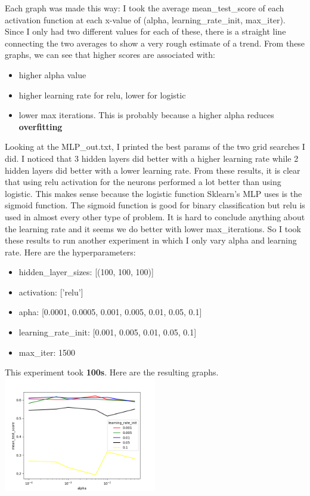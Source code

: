 \documentclass[12pt]{article}
\begin{document}
Each graph was made this way: I took the average mean\_test\_score of each activation function at each x-value of (alpha, learning\_rate\_init, max\_iter). Since I only had two different values for each of these, there is a straight line connecting the two averages to show a very rough estimate of a trend. From these graphs, we can see that higher scores are associated with:
\begin{itemize}
    \item higher alpha value
    \item higher learning rate for relu, lower for logistic
    \item lower max iterations. This is probably because a higher alpha reduces \textbf{overfitting}
\end{itemize}
Looking at the MLP\_out.txt, I printed the best params of the two grid searches I did. I noticed that 3 hidden layers did better with a higher learning rate while 2 hidden layers did better with a lower learning rate. From these results, it is clear that using relu activation for the neurons performed a lot better than using logistic. This makes sense because the logistic function Sklearn's MLP uses is the sigmoid function. The sigmoid function is good for binary classification but relu is used in almost every other type of problem. It is hard to conclude anything about the learning rate and it seems we do better with lower max\_iterations. So I took these results to run another experiment in which I only vary alpha and learning rate. Here are the hyperparameters:
\begin{itemize}
    \item hidden\_layer\_sizes: [(100, 100, 100)]
    \item activation: ['relu']
    \item apha: [0.0001, 0.0005, 0.001, 0.005, 0.01, 0.05, 0.1]
    \item learning\_rate\_init: [0.001, 0.005, 0.01, 0.05, 0.1]
    \item max\_iter: 1500
\end{itemize}
This experiment took \textbf{100s}. Here are the resulting graphs. \\
\includegraphics[width=0.5\textwidth]{MLP_fin_alpha_line.png}
\end{document}
